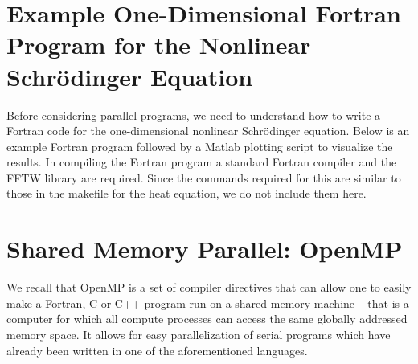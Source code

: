 



\section{Example One-Dimensional Fortran Program for the Nonlinear Schr\"{o}dinger Equation}

Before considering parallel programs, we need to understand how to write a Fortran code for the one-dimensional nonlinear Schr\"{o}dinger equation. Below is an example Fortran program followed by a Matlab plotting script to visualize the results. In compiling the Fortran program a standard Fortran compiler and the FFTW library are required. Since the commands required for this are similar to those in the makefile for the heat equation, we do not include them here.





\section{Shared Memory Parallel: OpenMP}

We recall that OpenMP is a set of compiler directives that can allow one to easily make a Fortran, C or C++ program run on a shared memory machine -- that is a computer for which all compute processes can access the same globally addressed memory space. It allows for easy parallelization of serial programs which have already been written in one of the aforementioned languages.

